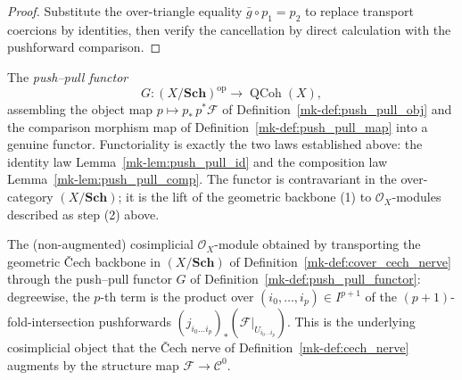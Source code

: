 \begin{proof}

  Substitute the over-triangle equality \(\bar g \circ p_1 = p_2\) to replace
  transport coercions by identities, then verify the cancellation by direct
  calculation with the pushforward comparison.
\end{proof}

\begin{definition}\label{mk-def:push_pull_functor}
  \leanok

  The \emph{push--pull functor}
  \[
    G : (X/\mathbf{Sch})^{\mathrm{op}} \longrightarrow \operatorname{QCoh}(X),
  \]
  assembling the object map \(p \mapsto p_*\, p^*\mathcal{F}\) of
  Definition~\ref{mk-def:push_pull_obj} and the comparison morphism map of
  Definition~\ref{mk-def:push_pull_map} into a genuine functor. Functoriality is exactly the two
  laws established above: the identity law
  Lemma~\ref{mk-lem:push_pull_id} and the composition law Lemma~\ref{mk-lem:push_pull_comp}. The
  functor is contravariant in the over-category \((X/\mathbf{Sch})\); it is the lift of the
  geometric backbone (1) to \(\mathcal{O}_X\)-modules described as step (2) above.
\end{definition}

\begin{definition}\label{mk-def:cech_nerve_cosimplicial}
  \leanok

  The (non-augmented) cosimplicial \(\mathcal{O}_X\)-module obtained by transporting the
  geometric {\v C}ech backbone in \((X/\mathbf{Sch})\) of
  Definition~\ref{mk-def:cover_cech_nerve} through the push--pull functor
  \(G\) of Definition~\ref{mk-def:push_pull_functor}: degreewise, the \(p\)-th term is the
  product over \((i_0, \ldots, i_p) \in I^{p+1}\) of the \((p+1)\)-fold-intersection
  pushforwards \((j_{i_0 \ldots i_p})_*(\mathcal{F}|_{U_{i_0 \ldots i_p}})\). This is the
  underlying cosimplicial object that the {\v C}ech nerve of
  Definition~\ref{mk-def:cech_nerve} augments by the structure map \(\mathcal{F} \to
  \mathcal{C}^0\).
\end{definition}

